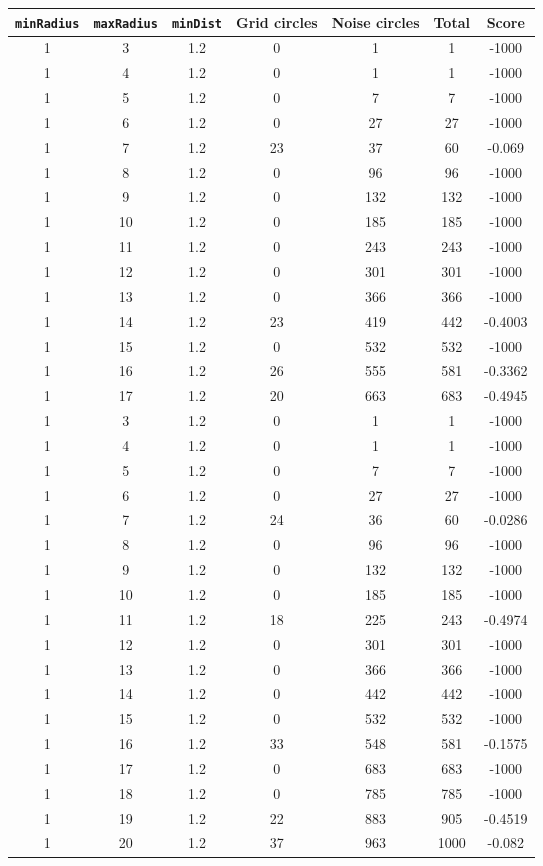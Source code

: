 \documentclass[letterpaper, 12pt]{article}
\begin{document}
\begin{longtable}{|c|c|c|c|c|c|c|}
\hline
\textbf{\texttt{minRadius}} & \textbf{\texttt{maxRadius}} & \textbf{\texttt{minDist}} & \textbf{Grid circles} & \textbf{Noise circles} & \textbf{Total} & \textbf{Score} \\
\hline
1 & 3 & 1.2 & 0 & 1 & 1 & -1000 \\
\hline
1 & 4 & 1.2 & 0 & 1 & 1 & -1000 \\
\hline
1 & 5 & 1.2 & 0 & 7 & 7 & -1000 \\
\hline
1 & 6 & 1.2 & 0 & 27 & 27 & -1000 \\
\hline
1 & 7 & 1.2 & 23 & 37 & 60 & -0.069 \\
\hline
1 & 8 & 1.2 & 0 & 96 & 96 & -1000 \\
\hline
1 & 9 & 1.2 & 0 & 132 & 132 & -1000 \\
\hline
1 & 10 & 1.2 & 0 & 185 & 185 & -1000 \\
\hline
1 & 11 & 1.2 & 0 & 243 & 243 & -1000 \\
\hline
1 & 12 & 1.2 & 0 & 301 & 301 & -1000 \\
\hline
1 & 13 & 1.2 & 0 & 366 & 366 & -1000 \\
\hline
1 & 14 & 1.2 & 23 & 419 & 442 & -0.4003 \\
\hline
1 & 15 & 1.2 & 0 & 532 & 532 & -1000 \\
\hline
1 & 16 & 1.2 & 26 & 555 & 581 & -0.3362 \\
\hline
1 & 17 & 1.2 & 20 & 663 & 683 & -0.4945 \\
\hline
1 & 3 & 1.2 & 0 & 1 & 1 & -1000 \\
\hline
1 & 4 & 1.2 & 0 & 1 & 1 & -1000 \\
\hline
1 & 5 & 1.2 & 0 & 7 & 7 & -1000 \\
\hline
1 & 6 & 1.2 & 0 & 27 & 27 & -1000 \\
\hline
1 & 7 & 1.2 & 24 & 36 & 60 & -0.0286 \\
\hline
1 & 8 & 1.2 & 0 & 96 & 96 & -1000 \\
\hline
1 & 9 & 1.2 & 0 & 132 & 132 & -1000 \\
\hline
1 & 10 & 1.2 & 0 & 185 & 185 & -1000 \\
\hline
1 & 11 & 1.2 & 18 & 225 & 243 & -0.4974 \\
\hline
1 & 12 & 1.2 & 0 & 301 & 301 & -1000 \\
\hline
1 & 13 & 1.2 & 0 & 366 & 366 & -1000 \\
\hline
1 & 14 & 1.2 & 0 & 442 & 442 & -1000 \\
\hline
1 & 15 & 1.2 & 0 & 532 & 532 & -1000 \\
\hline
1 & 16 & 1.2 & 33 & 548 & 581 & -0.1575 \\
\hline
1 & 17 & 1.2 & 0 & 683 & 683 & -1000 \\
\hline
1 & 18 & 1.2 & 0 & 785 & 785 & -1000 \\
\hline
1 & 19 & 1.2 & 22 & 883 & 905 & -0.4519 \\
\hline
1 & 20 & 1.2 & 37 & 963 & 1000 & -0.082 \\
\hline
\end{longtable}
\end{document}
